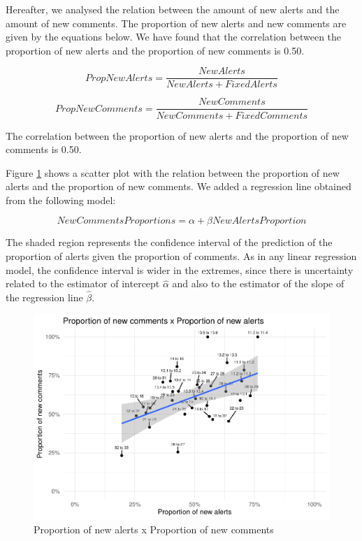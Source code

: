 \documentclass[
]{article}
\begin{document}
\normalsize

\newpage

\small

\normalsize

Hereafter, we analysed the relation between the amount of new alerts and
the amount of new comments. The proportion of new alerts and new
comments are given by the equations below. We have found that the
correlation between the proportion of new alerts and the proportion of
new comments is 0.50.

\[PropNewAlerts = \frac{NewAlerts}{NewAlerts + FixedAlerts}\]

\[PropNewComments = \frac{NewComments}{NewComments + FixedComments}\]

The correlation between the proportion of new alerts and the proportion
of new comments is 0.50.

Figure \ref{scatter_prop} shows a scatter plot with the relation between
the proportion of new alerts and the proportion of new comments. We
added a regression line obtained from the following model:

\[ NewCommentsProportions = \alpha + \beta NewAlertsProportion \]

The shaded region represents the confidence interval of the prediction
of the proportion of alerts given the proportion of comments. As in any
linear regression model, the confidence interval is wider in the
extremes, since there is uncertainty related to the estimator of
intercept \(\hat{\alpha}\) and also to the estimator of the slope of the
regression line \(\hat{\beta}\).

\small

\begin{figure}
\centering
\includegraphics{report_files/figure-latex/unnamed-chunk-26-1.pdf}
\caption{\label{scatter_prop}Proportion of new alerts x Proportion of
new comments}
\end{figure}
\end{document}
